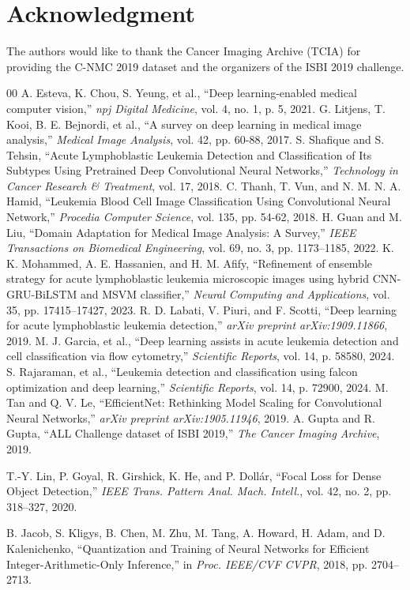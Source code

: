 \documentclass[journal]{IEEEtran}
\begin{document}
    \section*{Acknowledgment}
    The authors would like to thank the Cancer Imaging Archive (TCIA) for providing the C-NMC 2019 dataset and the organizers of the ISBI 2019 challenge.

    \begin{thebibliography}{00}
     A. Esteva, K. Chou, S. Yeung, et al., ``Deep learning-enabled medical computer vision,'' \emph{npj Digital Medicine}, vol. 4, no. 1, p. 5, 2021.
     G. Litjens, T. Kooi, B. E. Bejnordi, et al., ``A survey on deep learning in medical image analysis,'' \emph{Medical Image Analysis}, vol. 42, pp. 60-88, 2017.
     S. Shafique and S. Tehsin, ``Acute Lymphoblastic Leukemia Detection and Classification of Its Subtypes Using Pretrained Deep Convolutional Neural Networks,'' \emph{Technology in Cancer Research \& Treatment}, vol. 17, 2018.
     C. Thanh, T. Vun, and N. M. N. A. Hamid, ``Leukemia Blood Cell Image Classification Using Convolutional Neural Network,'' \emph{Procedia Computer Science}, vol. 135, pp. 54-62, 2018.
     H. Guan and M. Liu, ``Domain Adaptation for Medical Image Analysis: A Survey,'' \emph{IEEE Transactions on Biomedical Engineering}, vol. 69, no. 3, pp. 1173--1185, 2022.
     K. K. Mohammed, A. E. Hassanien, and H. M. Afify, ``Refinement of ensemble strategy for acute lymphoblastic leukemia microscopic images using hybrid CNN-GRU-BiLSTM and MSVM classifier,'' \emph{Neural Computing and Applications}, vol. 35, pp. 17415--17427, 2023.
     R. D. Labati, V. Piuri, and F. Scotti, ``Deep learning for acute lymphoblastic leukemia detection,'' \emph{arXiv preprint arXiv:1909.11866}, 2019.
     M. J. Garcia, et al., ``Deep learning assists in acute leukemia detection and cell classification via flow cytometry,'' \emph{Scientific Reports}, vol. 14, p. 58580, 2024.
     S. Rajaraman, et al., ``Leukemia detection and classification using falcon optimization and deep learning,'' \emph{Scientific Reports}, vol. 14, p. 72900, 2024.
     M. Tan and Q. V. Le, ``EfficientNet: Rethinking Model Scaling for Convolutional Neural Networks,'' \emph{arXiv preprint arXiv:1905.11946}, 2019.
     A. Gupta and R. Gupta, ``ALL Challenge dataset of ISBI 2019,'' \emph{The Cancer Imaging Archive}, 2019.

    T.-Y. Lin, P. Goyal, R. Girshick, K. He, and P. Dollár,
    ``Focal Loss for Dense Object Detection,''
    \textit{IEEE Trans. Pattern Anal. Mach. Intell.},
    vol. 42, no. 2, pp. 318--327, 2020.

    B. Jacob, S. Kligys, B. Chen, M. Zhu, M. Tang, A. Howard,
    H. Adam, and D. Kalenichenko,
    ``Quantization and Training of Neural Networks for Efficient
    Integer-Arithmetic-Only Inference,''
    in \textit{Proc. IEEE/CVF CVPR}, 2018, pp. 2704--2713.
    \end{thebibliography}

    
\end{document}

